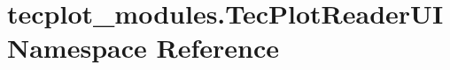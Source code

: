 \hypertarget{namespacetecplot__modules_1_1_tec_plot_reader_u_i}{}\section{tecplot\+\_\+modules.\+Tec\+Plot\+Reader\+UI Namespace Reference}
\label{namespacetecplot__modules_1_1_tec_plot_reader_u_i}
